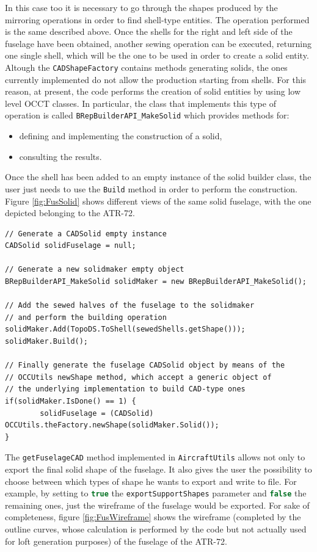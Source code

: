 \bigskip
\noindent
In this case too it is necessary to go through the shapes produced by the mirroring operations in order to find shell-type entities. The operation performed is the same described above. Once the shells for the right and left side of the fuselage have been obtained, another sewing operation can be executed, returning one single shell, which will be the one to be used in order to create a solid entity. Altough the \lstinline[language=Java]!CADShapeFactory! contains methods generating solids, the ones currently implemented do not allow the production starting from shells. For this reason, at present, the code performs the creation of solid entities by using low level \gls{OCCT} classes. In particular, the class that implements this type of operation is called \lstinline[language=Java]!BRepBuilderAPI_MakeSolid! which provides methods for:
%
\begin{itemize}
\item defining and implementing the construction of a solid,
\item consulting the results.
\end{itemize}
%
Once the shell has been added to an empty instance of the solid builder class, the user just needs to use the \lstinline[language=Java]!Build! method in order to perform the construction. Figure \ref{fig:FusSolid} shows different views of the same solid fuselage, with the one depicted belonging to the ATR-72. 
%
\bigskip
\begin{lstlisting}[caption={Fuselage solid building step}, captionpos=b, tabsize=2, label={lst:FuselageSolid}]
// Generate a CADSolid empty instance 
CADSolid solidFuselage = null;

// Generate a new solidmaker empty object
BRepBuilderAPI_MakeSolid solidMaker = new BRepBuilderAPI_MakeSolid();

// Add the sewed halves of the fuselage to the solidmaker
// and perform the building operation
solidMaker.Add(TopoDS.ToShell(sewedShells.getShape()));
solidMaker.Build();

// Finally generate the fuselage CADSolid object by means of the
// OCCUtils newShape method, which accept a generic object of 
// the underlying implementation to build CAD-type ones
if(solidMaker.IsDone() == 1) {
		solidFuselage = (CADSolid) OCCUtils.theFactory.newShape(solidMaker.Solid());
}
\end{lstlisting}

\bigskip
\noindent
The \lstinline[language=Java]!getFuselageCAD! method implemented in \lstinline[language=Java]!AircraftUtils! allows not only to export the final solid shape of the fuselage. It also gives the user the possibility to choose between which types of shape he wants to export and write to file. For example, by setting to \lstinline[language=Java]!true! the \lstinline[language=Java]!exportSupportShapes! parameter and \lstinline[language=Java]!false! the remaining ones, just the wireframe of the fuselage would be exported. For sake of completeness, figure \ref{fig:FusWireframe} shows the wireframe (completed by the outline curves, whose calculation is performed by the code but not actually used for loft generation purposes) of the fuselage of the ATR-72.

